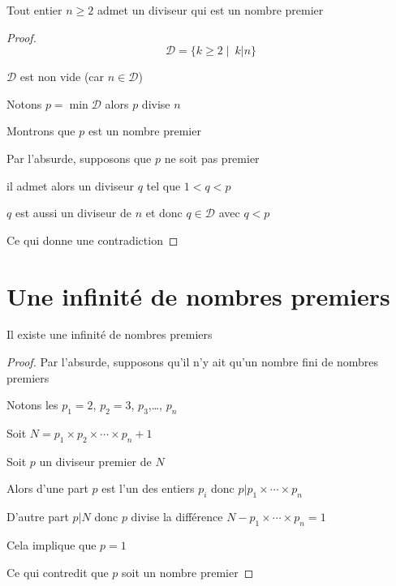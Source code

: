 \begin{frame}
\begin{lemme}
\label{lem:divprem}
Tout entier $n \ge 2$ admet un diviseur qui est un nombre premier
\end{lemme}

\pause
\medskip

\begin{proof}
$$\mathcal{D} = \big\{ k \ge 2 \mid \  k | n \big\}$$ 

\pause
$\mathcal{D}$ est non vide (car $n \in \mathcal{D}$)

\pause 

Notons $p = \min \mathcal{D}$ 
alors $p$ divise $n$

\pause 
\medskip

Montrons que $p$ est un nombre premier

\pause

\quad Par l'absurde, supposons que $p$ ne soit pas premier

\quad il admet alors un diviseur $q$ tel que $1 < q < p$

\pause

\quad $q$ est aussi un diviseur de $n$ et donc $q \in \mathcal{D}$ avec $q<p$

\pause

\quad Ce qui donne une contradiction
\end{proof}
\end{frame}

\section{Une infinité de nombres premiers}

\begin{frame}
  
\begin{proposition}
Il existe une infinité de nombres premiers
\end{proposition}

\pause
\medskip

\begin{proof}
Par l'absurde, supposons qu'il n'y ait qu'un nombre fini de nombres premiers 

\pause 

Notons les $p_1=2$, $p_2=3$, $p_3$,\ldots, $p_n$

\pause 

Soit $N=p_1\times p_2\times \cdots \times p_n+ 1$

Soit $p$ un diviseur premier de $N$

\pause

Alors d'une part $p$ est l'un des entiers $p_i$
donc $p | p_1\times \cdots \times p_n$

\pause

D'autre part $p|N$ donc $p$ divise la différence $N-p_1\times \cdots \times p_n=1$

\pause

Cela implique que $p=1$

\pause 

Ce qui contredit que $p$ soit un nombre premier
\end{proof}

\end{frame}

